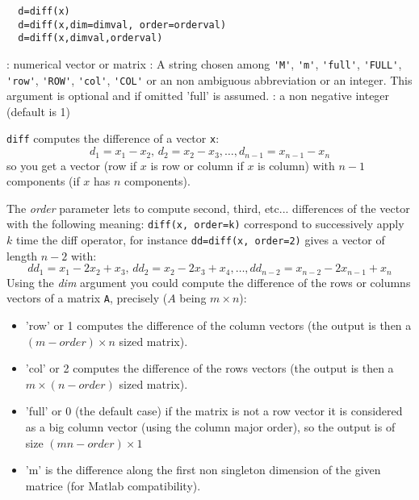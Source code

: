 \begin{mandesc}
\end{mandesc}
\begin{calling_sequence}
\begin{verbatim}
  d=diff(x)  
  d=diff(x,dim=dimval, order=orderval)  
  d=diff(x,dimval,orderval)
\end{verbatim}
\end{calling_sequence}
\begin{parameters}
  \begin{varlist}
     : numerical vector or matrix
     : A string chosen among \verb+'M'+, \verb+'m'+, \verb+'full'+, \verb+'FULL'+, \verb+'row'+,
    \verb+'ROW'+, \verb+'col'+, \verb+'COL'+ or an non ambiguous abbreviation or an integer. 
    This argument is optional and if omitted 'full' is assumed.
     : a non negative integer (default is 1)   
  \end{varlist}
\end{parameters}
\begin{mandescription}
  \verb+diff+ computes the difference of a vector \verb+x+:
$$
d_1 = x_1 - x_2, \, d_2 = x_2 - x_3, \dots, d_{n-1} = x_{n-1} - x_n
$$
 so you get a vector (row if $x$ is row or column if $x$ is column) with 
 $n-1$ components (if $x$ has $n$ components).

 The {\em order} parameter lets to compute second, third, etc... differences of the vector
 with the following meaning: \verb+diff(x, order=k)+ correspond to successively apply 
 $k$ time the diff operator, for instance  \verb+dd=diff(x, order=2)+ gives a vector of
 length $n-2$ with:
$$
dd_1 = x_1 - 2x_2 + x_3, \, dd_2 = x_2 - 2x_3 + x_4, \dots, dd_{n-2} = x_{n-2} - 2x_{n-1} + x_n
$$
Using the {\em dim} argument you could compute the difference of the rows or columns vectors
of a matrix \verb+A+, precisely ($A$ being $m \times n$):
  \begin{itemize}
    \item 'row' or 1  computes the difference of the column vectors (the output is then a $(m-order) \times n$
          sized matrix).
    \item 'col' or 2  computes the difference of the rows vectors (the output is then a $m \times (n-order)$
          sized matrix).
    \item 'full' or 0 (the default case) if the matrix is not a row vector it is considered as 
           a big column vector (using the column major order), so the output is of size $(mn - order) \times 1$
    \item 'm' is the difference along the first non singleton dimension of the given matrice 
          (for Matlab compatibility). 
  \end{itemize}
\end{mandescription}


